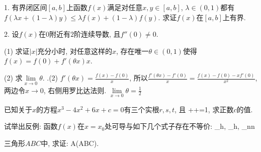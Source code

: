 1. 有界闭区间$[a,b]$上函数$f(x)$满足对任意$x,y\in [a,b]$, $\lambda\in(0,1)$都有$f(\lambda x+(1-\lambda)y)\le\lambda f(x)+(1-\lambda)f(y)$. 求证$f(x)$在$[a,b]$上有界.

2. 设$f(x)$在$0$附近有$2$阶连续导数, 且$f''(0)\ne0$. 

(1) 求证$|x|$充分小时, 对任意这样的$x$, 存在唯一$\theta\in(0,1)$使得$f(x)=f(0)+f'(\theta x)x$.

(2) 求$\lim\limits_{x\to 0}\theta$.
\eu
{}.(2) $f'(\theta x)=\frac{f(x)-f(0)}{x}$, 所以$\frac{f'(\theta x)-f'(0)}{x}=\frac{f(x)-f(0)-xf'(0)}{x^2}$, 两边令$x\to0$, 右侧用罗比达法则. $\lim\limits_{x\to 0}\theta=\frac12$
\ea

已知关于$x$的方程$x^3-4x^2+6x+c=0$有三个实根$r, s, t$, 且
\bee
{}++=1,
\eee
求正数$c$的值.
\eu

试举出反例: 函数$f(x)$在$x=x_0$处可导与如下几个式子存在不等价:
\bee
\lim_{h},\quad
\lim_{h},\quad
\lim_{n\to\infty}n
\eee
\eu

三角形$ABC$中, 求证: 
\bee
\prodcyc\cos A\le{}\cot{}\tan(ABC)\le\prodcyc\sin{}.
\eee
\eu
